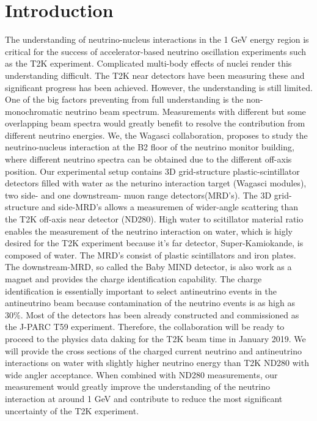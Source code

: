 \section{Introduction}

The understanding of neutrino-nucleus interactions in the 1 GeV energy region is critical for the success
of accelerator-based neutrino oscillation experiments such as the T2K experiment.
Complicated multi-body effects of nuclei render this understanding difficult.
The T2K near detectors have been measuring these and significant progress has been achieved.
However, the understanding is still limited.
One of the big factors preventing from full understanding is the non-monochromatic
neutrino beam spectrum.
Measurements with different but some overlapping beam spectra would greatly benefit to resolve the contribution
from different neutrino energies.
We, the Wagasci collaboration, proposes to study the neutrino-nucleus interaction
at the B2 floor of the neutrino monitor building, where different neutrino spectra
can be obtained due to the different off-axis position.
Our experimental setup contains 3D grid-structure plastic-scintillator detectors filled with water as the neturino interaction target
(Wagasci modules), two side- and one downstream- muon range detectors(MRD's).
The 3D grid-structure and side-MRD's allows a measuremen of  wider-angle scattering than the T2K off-axis near detector (ND280).
High water to scitillator material ratio enables the measurement of the neutrino interaction on water, which
is higly desired for the T2K experiment because it's far detector, Super-Kamiokande, is composed of water.
The MRD's consist of plastic scintillators and iron plates.
The downstream-MRD, so called the Baby MIND detector, is also work as a magnet and provides the charge identification capability.
The charge identification is essentially important to select antineutrino events in the antineutrino beam
because contamination of the neutrino events is as high as 30\%.
Most of the detectors has been already constructed and commissioned as the J-PARC T59 experiment.
Therefore, the collaboration will be ready to proceed to the physics data daking for the T2K beam time in January 2019.
We will provide the cross sections of the charged current neutrino and antineutrino interactions on water
with slightly higher neutrino energy than T2K ND280 with wide angler acceptance.
When combined with ND280 measurements, our measurement would greatly improve the understanding of the neutrino interaction
at around 1 GeV and contribute to reduce the most significant uncertainty of the T2K experiment.
